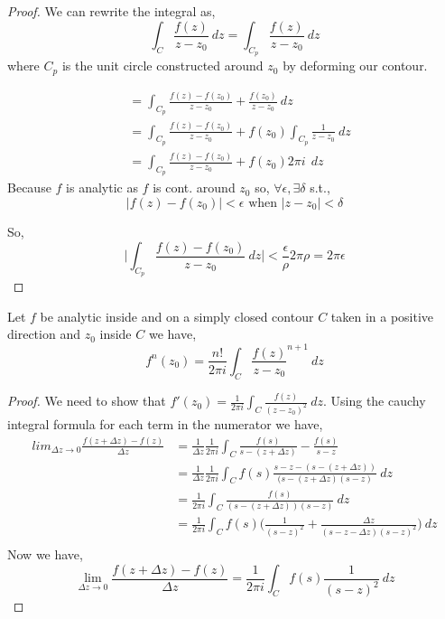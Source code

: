 \begin{proof}
   We can rewrite the integral as, 
   $$\int_C \frac{f(z)}{z - z_0}\:dz = \int_{C_p} \frac{f(z)}{z - z_0}\:dz$$ where $C_p$ is the unit circle constructed around $z_0$ by deforming our contour.

   \begin{align*}
   &=\int_{C_p} \frac{f(z) - f(z_0)}{z - z_0} + \frac{f(z_0)}{z - z_0}\:dz\\
   &=\int_{C_p} \frac{f(z) - f(z_0)}{z - z_0} + f(z_0) \int_{C_p}\frac{1}{z - z_0}\:dz\\
   &=\int_{C_p} \frac{f(z) - f(z_0)}{z - z_0} + f(z_0)2\pi i \: \:dz
   \end{align*}
   Because $f$ is analytic as $f$ is cont. around $z_0$ so, $\forall \epsilon, \exists \delta$ s.t.,  
   $$ |f (z) - f(z_0)| < \epsilon \text{ when } |z - z_0| < \delta $$ 

   So, 
   $$ \bigg | \int_{C_p} \frac{f(z) - f(z_0)}{z - z_0} \:dz \bigg| < \frac{\epsilon}{\rho} 2 \pi \rho = 2\pi \epsilon$$ 

\end{proof}


\begin{theorem}
   Let $f$ be analytic inside and on a simply closed contour $C$ taken in a positive direction and $z_0$ inside $C$ we have, 
   $$ f^{n} (z_0) = \frac{n!}{2\pi i}\int_C \frac{f(z)}{z - z_0}^{n+1}\:dz $$ 
\end{theorem}

\begin{proof}
We need to show that $f'(z_0) = \frac{1}{2\pi i} \int_C \frac{f(z)}{(z - z_0)^2} \: dz$. Using the cauchy integral formula for each term in the numerator we have, 
\begin{align*}
   lim_{\Delta z \rightarrow 0} \frac{f(z + \Delta z) - f(z)}{\Delta z}  &= \frac{1}{\Delta z} \frac{1}{2 \pi i} \int_C \frac{f(s)}{s - (z + \Delta z)} - \frac{f(s)}{s - z}\\
    &=\frac{1}{\Delta z} \frac{1}{2 \pi i} \int_C f(s) \frac{s - z - (s - (z + \Delta z))}{(s - (z + \Delta z)(s - z)} \: dz\\
    &=\frac{1}{2\pi i}\int_C \frac{f(s)}{(s - (z + \Delta z))(s - z)} \: dz\\
    &=\frac{1}{2\pi i} \int_C f(s) \bigg ( \frac{1}{(s-z)^2} + \frac{\Delta z}{(s - z - \Delta z)(s-z)^2} \bigg ) \: dz\\
\end{align*}
Now we have, 
$$ \lim_{\Delta z \to 0} \frac{f(z + \Delta z) - f(z)}{\Delta z} = \frac{1}{2 \pi i}\int_C f(s) \frac{1}{(s-z)^2} \: dz $$ 




   
\end{proof}


